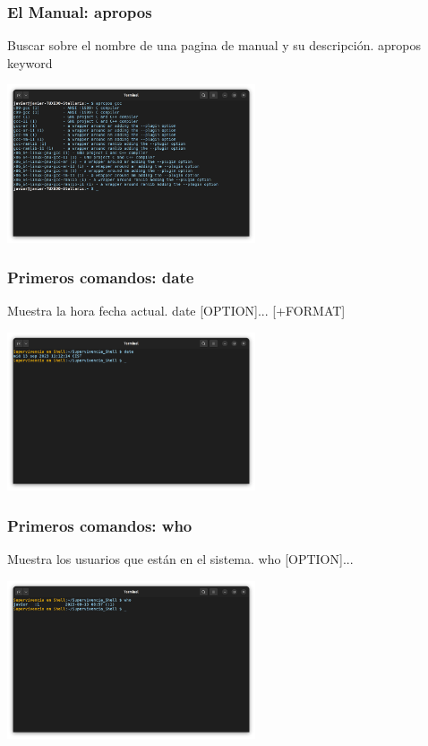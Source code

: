 \documentclass[10pt]{beamer}
\begin{document}
	\begin{frame}
		\frametitle{El Manual: apropos}
		\begin{alertblock}{Buscar sobre el nombre de una pagina de manual y su descripción.}
			apropos keyword
		\end{alertblock}
		\begin{center}
			\includegraphics[width=0.55\textwidth]{apropos}
		\end{center}
	\end{frame}

	\begin{frame}
		\frametitle{Primeros comandos: date}
		\begin{alertblock}{Muestra la hora fecha actual.}
			date [OPTION]... [+FORMAT]
		\end{alertblock}
		\begin{center}
			\includegraphics[width=0.55\textwidth]{date}
		\end{center}
	\end{frame}
	
	\begin{frame}
		\frametitle{Primeros comandos: who}
		\begin{alertblock}{Muestra los usuarios que están en el sistema.}
			who [OPTION]...
		\end{alertblock}
		\begin{center}
			\includegraphics[width=0.55\textwidth]{who}
		\end{center}
	\end{frame}
	
\end{document}
